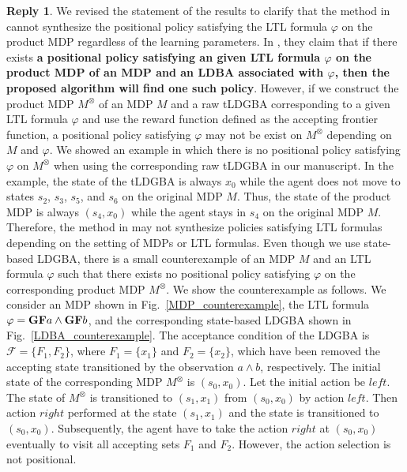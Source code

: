 \documentclass[10 pt, dvipdfmx]{article}
\theoremstyle{definition}
\newtheorem{review point}{Review Point}[section]
\newtheorem*{reply}{Reply}
\begin{document}
\begin{reply}
  We revised the statement of the results to clarify that the method in \cite{HAK2019} cannot synthesize the positional policy satisfying the LTL formula $\varphi$ on the product MDP regardless of the learning parameters. In \cite{HAK2019}, they claim that if there exists {\bf a positional policy satisfying an given LTL formula $\varphi$ on the product MDP of an MDP and an LDBA associated with $\varphi$, then the proposed algorithm will find one such policy}. However, if we construct the product MDP $M^{\otimes}$ of an MDP $M$ and a raw tLDGBA corresponding to a given LTL formula $\varphi$ and use the reward function defined as the accepting frontier function, a positional policy satisfying $\varphi$ may not be exist on $M^{\otimes}$ depending on $M$ and $\varphi$. We showed an example in which there is no positional policy satisfying $\varphi$ on $M^{\otimes}$ when using the corresponding raw tLDGBA in our manuscript. In the example, the state of the tLDGBA is always $x_0$ while the agent does not move to states $s_2$, $s_3$, $s_5$, and $s_6$ on the original MDP $M$. Thus, the state of the product MDP is always $(s_4, x_0)$ while the agent stays in $s_4$ on the original MDP $M$. Therefore, the method in \cite{HAK2019} may not synthesize policies satisfying LTL formulas depending on the setting of MDPs or LTL formulas.
  Even though we use state-based LDGBA, there is a small counterexample of an MDP $M$ and an LTL formula $\varphi$ such that there exists no positional policy satisfying $\varphi$ on the corresponding product MDP $M^{\otimes}$. We show the counterexample as follows. We consider an MDP shown in Fig.\ \ref{MDP_counterexample}, the LTL formula
  $\varphi = \text{{\bf GF}}a \land \text{{\bf GF}}b$, and the corresponding state-based LDGBA shown in Fig.\ \ref{LDBA_counterexample}. The acceptance condition of the LDGBA is $\mathcal{F} = \{ F_1, F_2 \}$, where $F_1 = \{ x_1 \}$ and $F_2 = \{ x_2 \}$, which have been removed the accepting state transitioned by the observation $a\land b$, respectively. The initial state of the corresponding MDP $M^{\otimes}$ is $(s_0,x_0)$. Let the initial action be $left$. The state of $M^{\otimes}$ is transitioned to $(s_1,x_1)$ from $(s_0,x_0)$ by action $left$. Then action $right$ performed at the state $(s_1,x_1)$ and the state is transitioned to $(s_0,x_0)$. Subsequently, the agent have to take the action $right$ at $(s_0,x_0)$ eventually to visit all accepting sets $F_1$ and $F_2$. However, the action selection is not positional.


\end{reply}
\end{document}
